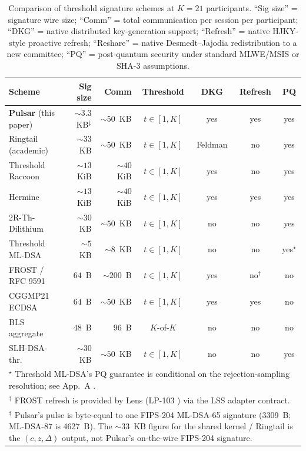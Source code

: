 \begin{table}[H]
\centering
\small
\caption{Comparison of threshold signature schemes at $K = 21$
participants. ``Sig size'' = signature wire size; ``Comm'' = total
communication per session per participant; ``DKG'' = native distributed
key-generation support; ``Refresh'' = native HJKY-style proactive
refresh; ``Reshare'' = native Desmedt--Jajodia redistribution to a new
committee; ``PQ'' = post-quantum security under standard MLWE/MSIS or
SHA-3 assumptions.}
\label{tab:comparison}
\begin{tabular}{lrrcccc}
\toprule
Scheme & Sig size & Comm & Threshold & DKG & Refresh & PQ \\
\midrule
\textbf{Pulsar} (this paper) & $\sim 3.3$~KB${}^\ddagger$ & $\sim 50$~KB & $t \in [1, K]$ & yes & yes & yes \\
Ringtail (academic) \cite{ringtail} & $\sim 33$~KB & $\sim 50$~KB & $t \in [1, K]$ & Feldman & no & yes \\
Threshold Raccoon \cite{thresholdraccoon} & $\sim 13$~KiB & $\sim 40$~KiB & $t \in [1, K]$ & yes & no & yes \\
Hermine \cite{hermine} & $\sim 13$~KiB & $\sim 40$~KiB & $t \in [1, K]$ & yes & yes & yes \\
2R-Th-Dilithium \cite{damgard2021} & $\sim 30$~KB & $\sim 50$~KB & $t \in [1, K]$ & no & no & yes \\
Threshold ML-DSA \cite{tmldsa2025} & $\sim 5$~KB & $\sim 8$~KB & $t \in [1, K]$ & no & no & yes${}^\star$ \\
FROST / RFC 9591 \cite{rfc9591} & $64$~B & $\sim 200$~B & $t \in [1, K]$ & yes & no${}^\dagger$ & no \\
CGGMP21 ECDSA \cite{cggmp21} & $64$~B & $\sim 50$~KB & $t \in [1, K]$ & yes & yes & no \\
BLS aggregate \cite{bls} & $48$~B & $96$~B & $K$-of-$K$ & no & no & no \\
SLH-DSA-thr. \cite{cosmin2021} & $\sim 30$~KB & $\sim 50$~KB & $t \in [1, K]$ & no & no & yes \\
\bottomrule
\multicolumn{7}{l}{\footnotesize ${}^\star$ Threshold ML-DSA's PQ
guarantee is conditional on the rejection-sampling resolution; see
App.~A \cite{quasarcertsoundness}.} \\
\multicolumn{7}{l}{\footnotesize ${}^\dagger$ FROST refresh is provided
by Lens (LP-103 \cite{lp103}) via the LSS adapter contract.} \\
\multicolumn{7}{l}{\footnotesize ${}^\ddagger$ Pulsar's pulse is
byte-equal to one FIPS-204 ML-DSA-65 signature (3309~B; ML-DSA-87 is
4627~B). The $\sim 33$~KB figure for the shared kernel / Ringtail is the
$(c,z,\Delta)$ output, not Pulsar's on-the-wire FIPS-204 signature.}
\end{tabular}
\end{table}

